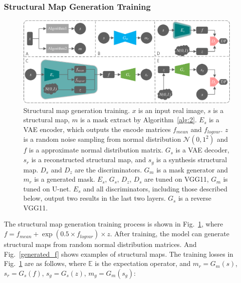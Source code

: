 \documentclass[runningheads]{llncs}
\begin{document}
	\subsubsection{Structural Map Generation Training}
	\begin{figure}[th]
		\centering
		\includegraphics[width=1\columnwidth]{figures/feature_train}
		\caption{Structural map generation training. $x$ is an input real image, $s$ is a structural map, $m$ is a mask extract by Algorithm~\ref{alg:2}. $E_s$ is a VAE encoder, which outputs the encode matrices $f_{mean}$ and $f_{logvar}$. $z$ is a random noise sampling from normal distribution $\mathcal{N}(0,1^2)$ and $f$ is a approximate normal distribution matrix. $G_s$ is a VAE decoder, $s_r$ is a reconstructed structural map, and $s_g$ is a synthesis structural map. $D_{s}$ and $D_{z}$ are the discriminators. $G_m$ is a mask generator and $m_r$ is a generated mask. $E_s $, $G_s$, $D_{z} $, $D_{s} $ are tuned on VGG11\cite{102simonyan2014very}, $G_m $ is tuned on U-net\cite{6zhu2017unpaired}. $E_s$ and all discriminators, including those described below, output two results in the last two layers. $G_s$ is a reverse VGG11. }
		\label{feature_train}
	\end{figure}
	The structural map generation training process is shown in Fig.~\ref{feature_train}, where $f=f_{mean}+\exp(0.5\times f_{logvar})\times z$. After training, the model can generate structural maps from random normal distribution matrices. And Fig.~\ref{generated_f} shows examples of structural maps. The training losses in Fig.~\ref{feature_train} are as follows, where $\mathbb{E}$ is the expectation operator, and $m_r=G_m(s)$, $s_r=G_s(f)$, $s_g=G_s(z)$, $m_g=G_m(s_g)$: 
\end{document}
